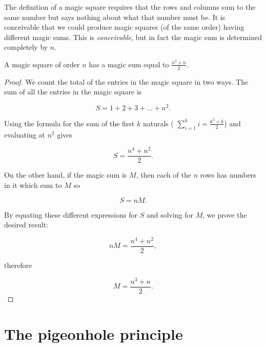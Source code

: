 The definition of a magic square requires that the rows and columns sum to 
the same number but says nothing about what that number must be.  
It is conceivable that we could produce magic squares (of the same order)
having different magic sums.  This is \emph{conceivable}, but in fact the
magic sum is determined completely by $n$.

\begin{thm}
A magic square of order $n$ has a magic sum equal to $\displaystyle\frac{n^3+n}{2}$.
\end{thm}

\begin{proof}
We count the total of the entries in the magic square in two ways.
The sum of all the entries in the magic square is

\[ S = 1 + 2 + 3 + \ldots + n^2. \]

Using the formula for the sum of the first $k$ naturals ( $\sum_{i=1}^k i = \frac{k^2+k}{2}$) and evaluating at $n^2$ gives

\[ S = \frac{n^4 + n^2}{2}. \]

On the other hand, if the magic sum is $M$, then each of the $n$ rows has 
numbers in it which sum to $M$ so

\[ S = nM. \]

By equating these different expressions for $S$ and solving for $M$, we
prove the desired result:

\[ nM = \frac{n^4 + n^2}{2}, \]

\noindent therefore

\[ M = \frac{n^3 + n}{2}. \]

\end{proof} 


\clearpage




\clearpage


\section{The pigeonhole principle}

